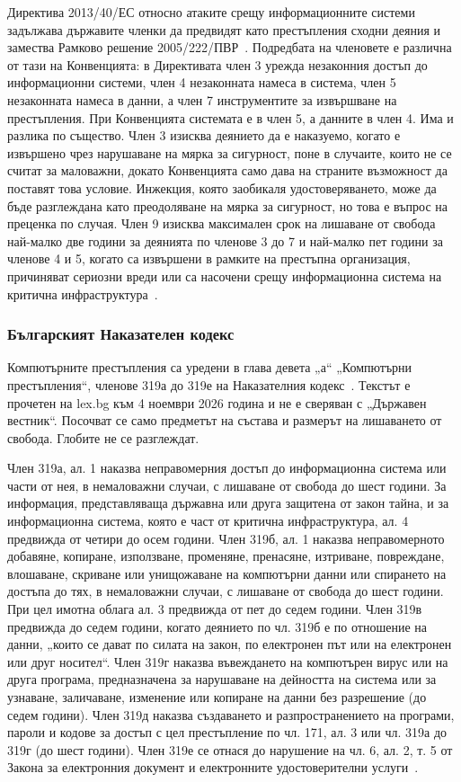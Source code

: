 Директива 2013/40/ЕС относно атаките срещу информационните системи задължава държавите членки
да предвидят като престъпления сходни деяния и замества Рамково решение 2005/222/ПВР~\cite{eu_2013_40}.
Подредбата на членовете е различна от тази на Конвенцията: в Директивата член 3
урежда незаконния достъп до информационни системи, член 4 незаконната намеса в
система, член 5 незаконната намеса в данни, а член 7 инструментите за извършване на
престъпления. При Конвенцията системата е в член 5, а данните в член 4.
Има и разлика по същество. Член 3 изисква деянието да е наказуемо, когато е
извършено чрез нарушаване на мярка за сигурност, поне в случаите, които не се
считат за маловажни, докато Конвенцията само дава на страните възможност да поставят
това условие. Инжекция, която заобикаля удостоверяването, може да бъде разглеждана
като преодоляване на мярка за сигурност, но това е въпрос на преценка по случая.
Член 9 изисква максимален срок на лишаване от свобода най-малко две години за
деянията по членове 3 до 7 и най-малко пет години за членове 4 и 5, когато са
извършени в рамките на престъпна организация, причиняват сериозни вреди или са
насочени срещу информационна система на критична инфраструктура~\cite{eu_2013_40}.

\subsubsection{Българският Наказателен кодекс}

Компютърните престъпления са уредени в глава девета „а“ „Компютърни
престъпления“, членове 319а до 319е на Наказателния кодекс~\cite{bg_nk}. Текстът е
прочетен на lex.bg към 4 ноември 2026 година и не е сверяван с „Държавен вестник“.
Посочват се само предметът на състава и размерът на лишаването от свобода. Глобите
не се разглеждат.

Член 319а, ал. 1 наказва неправомерния достъп до информационна система или части от
нея, в немаловажни случаи, с лишаване от свобода до шест години. За информация,
представляваща държавна или друга защитена от закон тайна, и за информационна
система, която е част от критична инфраструктура, ал. 4 предвижда от четири до осем
години. Член 319б, ал. 1 наказва неправомерното добавяне, копиране, използване,
променяне, пренасяне, изтриване, повреждане, влошаване, скриване или унищожаване на
компютърни данни или спирането на достъпа до тях, в немаловажни случаи, с лишаване от
свобода до шест години. При цел имотна облага ал. 3 предвижда от пет до седем години.
Член 319в предвижда до седем години, когато деянието по чл. 319б е по отношение на
данни, „които се дават по силата на закон, по електронен път или на електронен или
друг носител“. Член 319г наказва въвеждането на компютърен вирус или на друга
програма, предназначена за нарушаване на дейността на система или за узнаване,
заличаване, изменение или копиране на данни без разрешение (до седем години). Член
319д наказва създаването и разпространението на програми, пароли и кодове за достъп с
цел престъпление по чл. 171, ал. 3 или чл. 319а до 319г (до шест години). Член 319е
се отнася до нарушение на чл. 6, ал. 2, т. 5 от Закона за електронния документ и
електронните удостоверителни услуги~\cite{bg_nk}.

